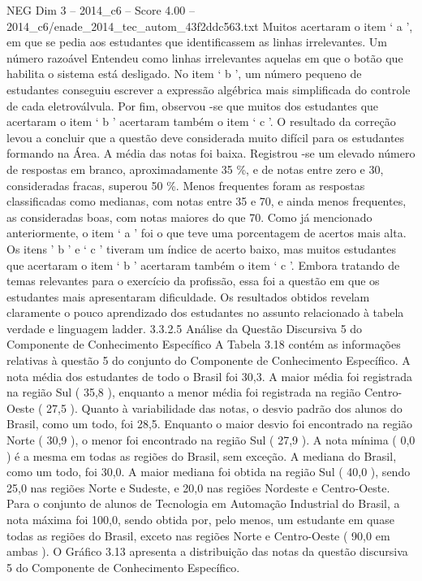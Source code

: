 \begin{textsample}{NEG Dim 3 – 2014\_c6 – Score 4.00 – 2014\_c6/enade\_2014\_tec\_autom\_43f2ddc563.txt}
Muitos acertaram o item ‘ a ’, em que se pedia aos estudantes que identificassem as linhas irrelevantes.
Um número razoável Entendeu como linhas irrelevantes aquelas em que o botão que habilita o sistema está desligado.
No item ‘ b ’, um número pequeno de estudantes conseguiu escrever a expressão algébrica mais simplificada do controle de cada eletroválvula.
Por fim, observou -se que muitos dos estudantes que acertaram o item ‘ b ’ acertaram também o item ‘ c ’.
O resultado da correção levou a concluir que a questão deve considerada muito difícil para os estudantes formando na Área.
A média das notas foi baixa.
Registrou -se um elevado número de respostas em branco, aproximadamente 35 \%, e de notas entre zero e 30, consideradas fracas, superou 50 \%.
Menos frequentes foram as respostas classificadas como medianas, com notas entre 35 e 70, e ainda menos frequentes, as consideradas boas, com notas maiores do que 70.
Como já mencionado anteriormente, o item ‘ a ’ foi o que teve uma porcentagem de acertos mais alta.
Os itens ’ b ’ e ‘ c ’ tiveram um índice de acerto baixo, mas muitos estudantes que acertaram o item ‘ b ’ acertaram também o item ‘ c ’.
Embora tratando de temas relevantes para o exercício da profissão, essa foi a questão em que os estudantes mais apresentaram dificuldade.
Os resultados obtidos revelam claramente o pouco aprendizado dos estudantes no assunto relacionado à tabela verdade e linguagem ladder. 3.3.2.5 Análise da Questão Discursiva 5 do Componente de Conhecimento Específico A Tabela 3.18 contém as informações relativas à questão 5 do conjunto do Componente de Conhecimento Específico.
A nota média dos estudantes de todo o Brasil foi 30,3.
A maior média foi registrada na região Sul ( 35,8 ), enquanto a menor média foi registrada na região Centro-Oeste ( 27,5 ).
Quanto à variabilidade das notas, o desvio padrão dos alunos do Brasil, como um todo, foi 28,5.
Enquanto o maior desvio foi encontrado na região Norte ( 30,9 ), o menor foi encontrado na região Sul ( 27,9 ).
A nota mínima ( 0,0 ) é a mesma em todas as regiões do Brasil, sem exceção.
A mediana do Brasil, como um todo, foi 30,0.
A maior mediana foi obtida na região Sul ( 40,0 ), sendo 25,0 nas regiões Norte e Sudeste, e 20,0 nas regiões Nordeste e Centro-Oeste.
Para o conjunto de alunos de Tecnologia em Automação Industrial do Brasil, a nota máxima foi 100,0, sendo obtida por, pelo menos, um estudante em quase todas as regiões do Brasil, exceto nas regiões Norte e Centro-Oeste ( 90,0 em ambas ).
O Gráfico 3.13 apresenta a distribuição das notas da questão discursiva 5 do Componente de Conhecimento Específico.

\end{textsample}
